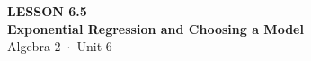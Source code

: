 \documentclass[aspectratio=169, 11pt]{beamer}
\begin{document}
{
\begin{frame}[plain]
  \vspace{2.8cm}\hspace{0.55cm}%
  \begin{minipage}{0.9\textwidth}
    {\color{goldacc}\bfseries\small LESSON 6.5}\\[0.5cm]
    {\color{white}\bfseries\LARGE Exponential Regression and Choosing a Model}\\[1.2cm]
    {\color{forestmid}\small Algebra 2~$\cdot$~Unit 6}
  \end{minipage}
\end{frame}
}

\begin{frame}[t, plain]
\end{frame}
\end{document}

